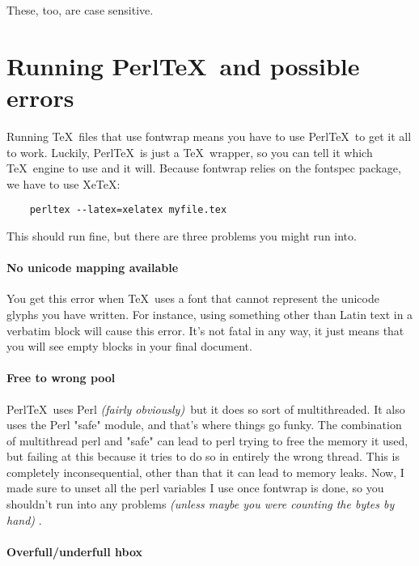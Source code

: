 \documentclass[12pt]{article}
\begin{document}
  These, too, are case sensitive.

  \section{Running Perl\TeX\ and possible errors}
  
  Running \TeX\ files that use fontwrap means you have to use Perl\TeX\ to
  get it all to work. Luckily, Perl\TeX\ is just a \TeX\ wrapper, so you can
  tell it which \TeX\ engine to use and it will. Because fontwrap relies on
  the fontspec package, we have to use Xe\TeX :
  
  \begin{verbatim}
    perltex --latex=xelatex myfile.tex
  \end{verbatim}
  
  This should run fine, but there are three problems you might run into.
  
  \paragraph{No unicode mapping available}
  
  You get this error when \TeX\ uses a font that cannot represent the
  unicode glyphs you have written. For instance, using something other
  than Latin text in a verbatim block will cause this error. It's
  not fatal in any way, it just means that you will see empty blocks
  in your final document.

  \paragraph{Free to wrong pool}
  
  Perl\TeX\ uses Perl \emph{(fairly obviously)}\ but it does so sort
  of multithreaded. It also uses the Perl "safe" module, and that's
  where things go funky. The combination of multithread perl and "safe"
  can lead to perl trying to free the memory it used, but failing 
  at this because it tries to do so in entirely the wrong thread.
  This is completely inconsequential, other than that it can lead
  to memory leaks. Now, I made sure to unset all the perl variables
  I use once fontwrap is done, so you shouldn't run into any problems
  \emph{(unless maybe you were counting the bytes by hand)} .
  
  \paragraph{Overfull/underfull hbox}
  
\end{document}
